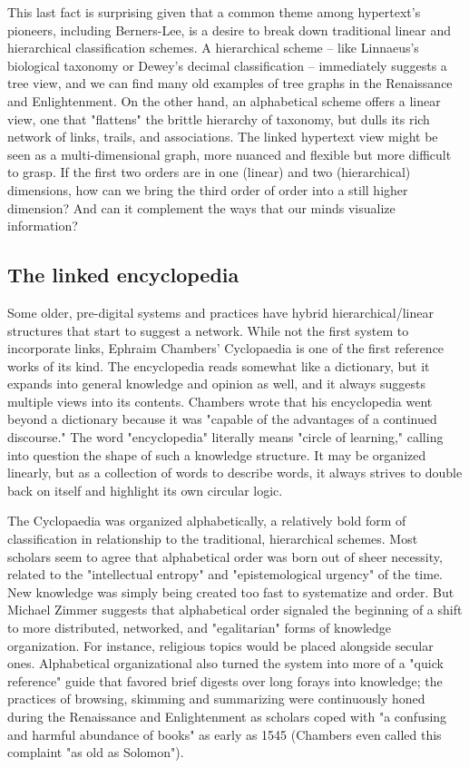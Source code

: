 This last fact is surprising given that a common theme among hypertext's pioneers, including Berners-Lee, is a desire to break down traditional linear and hierarchical classification schemes. A hierarchical scheme – like Linnaeus's biological taxonomy or Dewey's decimal classification – immediately suggests a tree view, and we can find many old examples of tree graphs in the Renaissance and Enlightenment.  On the other hand, an alphabetical scheme offers a linear view, one that "flattens" the brittle hierarchy of taxonomy, but dulls its rich network of links, trails, and associations. The linked hypertext view might be seen as a multi-dimensional graph, more nuanced and flexible but more difficult to grasp. If the first two orders are in one (linear) and two (hierarchical) dimensions, how can we bring the third order of order into a still higher dimension? And can it complement the ways that our minds visualize information?

\subsection{The linked encyclopedia}

Some older, pre-digital systems and practices have hybrid hierarchical/linear structures that start to suggest a network. While not the first system to incorporate links, Ephraim Chambers' Cyclopaedia is one of the first reference works of its kind. The encyclopedia reads somewhat like a dictionary, but it expands into general knowledge and opinion as well, and it always suggests multiple views into its contents. Chambers wrote that his encyclopedia went beyond a dictionary because it was "capable of the advantages of a continued discourse."  The word "encyclopedia" literally means "circle of learning," calling into question the shape of such a knowledge structure. It may be organized linearly, but as a collection of words to describe words, it always strives to double back on itself and highlight its own circular logic.

The Cyclopaedia was organized alphabetically, a relatively bold form of classification in relationship to the traditional, hierarchical schemes. Most scholars seem to agree that alphabetical order was born out of sheer necessity, related to the "intellectual entropy" and "epistemological urgency" of the time.  New knowledge was simply being created too fast to systematize and order. But Michael Zimmer suggests that alphabetical order signaled the beginning of a shift to more distributed, networked, and "egalitarian" forms of knowledge organization.  For instance, religious topics would be placed alongside secular ones. Alphabetical organizational also turned the system into more of a "quick reference" guide that favored brief digests over long forays into knowledge; the practices of browsing, skimming and summarizing were continuously honed during the Renaissance and Enlightenment as scholars coped with "a confusing and harmful abundance of books" as early as 1545 (Chambers even called this complaint "as old as Solomon"). 


